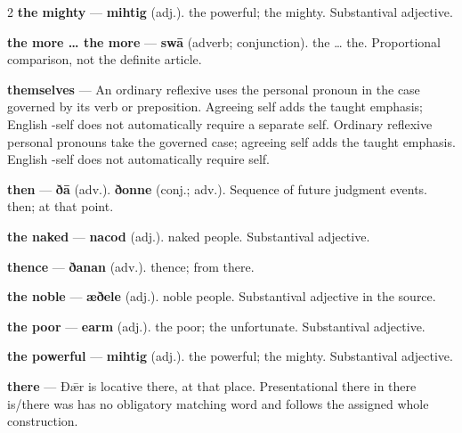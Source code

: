\begin{multicols}{2}
\textbf{the mighty} — \textbf{mihtig} (adj.). the powerful; the mighty. Substantival adjective.\par
\textbf{the more … the more} — \textbf{swā} (adverb; conjunction). the … the. Proportional comparison, not the definite article.\par
\textbf{themselves} — An ordinary reflexive uses the personal pronoun in the case governed by its verb or preposition. Agreeing self adds the taught emphasis; English -self does not automatically require a separate self. Ordinary reflexive personal pronouns take the governed case; agreeing self adds the taught emphasis. English -self does not automatically require self.\par
\textbf{then} — \textbf{ðā} (adv.).  \textbf{ðonne} (conj.; adv.). Sequence of future judgment events. then; at that point.\par
\textbf{the naked} — \textbf{nacod} (adj.). naked people. Substantival adjective.\par
\textbf{thence} — \textbf{ðanan} (adv.). thence; from there.\par
\textbf{the noble} — \textbf{æðele} (adj.). noble people. Substantival adjective in the source.\par
\textbf{the poor} — \textbf{earm} (adj.). the poor; the unfortunate. Substantival adjective.\par
\textbf{the powerful} — \textbf{mihtig} (adj.). the powerful; the mighty. Substantival adjective.\par
\textbf{there} — Ðǣr is locative there, at that place. Presentational there in there is/there was has no obligatory matching word and follows the assigned whole construction.\par

\end{multicols}
